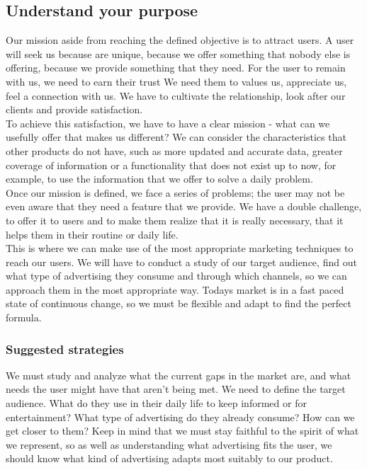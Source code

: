 \subsection{Understand your purpose}

Our mission aside from reaching the defined objective is to attract users.
A user will seek us because are unique, because we offer something that
nobody else is offering, because we provide something that they need.
For the user to remain with us, we need to earn their trust We need them to values us, appreciate us, feel a connection with us.
We have to cultivate the relationship, look after our clients and provide satisfaction.\\

To achieve this satisfaction, we have to have a clear mission - what can we usefully offer that makes us different?
We can consider the characteristics that other products do not have, such as more updated and accurate data,
greater coverage of information or a functionality that does not exist up to now, for example, to use the
information that we offer to solve a daily problem.\\

Once our mission is defined, we face a series of problems; the user may not be even aware that they need a feature that we provide. We have a double challenge, to offer it to users and
to make them realize that it is really necessary, that it helps them in their routine or daily life.\\

This is where we can make use of the most appropriate marketing techniques to reach our users.
We will have to conduct a study of our target audience, find out what type of advertising they consume and through which channels, so we can approach them in the most appropriate way. Todays market is in a fast paced state of continuous change,
so we must be flexible and adapt to find the perfect formula.

\subsubsection*{Suggested strategies}

We must study and analyze what the current gaps in the market are, and what needs the user might have that aren't being met.
We need to define the target audience. What do they use in their daily life to keep informed or for entertainment? What type of advertising do they already consume? How can we get closer to them? Keep in mind that we must stay
faithful to the spirit of what we represent, so as well as understanding what advertising fits the user, we should know what kind of advertising
adapts most suitably to our product.

